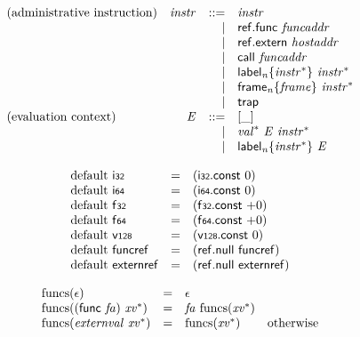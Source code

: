 $$
\begin{array}{@{}lrrl@{}l@{}}
\mbox{(administrative instruction)} & {\mathit{instr}} &::=& {\mathit{instr}} \\ &&|&
\mathsf{ref.func}~{\mathit{funcaddr}} \\ &&|&
\mathsf{ref.extern}~{\mathit{hostaddr}} \\ &&|&
\mathsf{call}~{\mathit{funcaddr}} \\ &&|&
{{\mathsf{label}}_{{\mathit{n}}}}{\{{{\mathit{instr}}^\ast}\}}~{{\mathit{instr}}^\ast} \\ &&|&
{{\mathsf{frame}}_{{\mathit{n}}}}{\{{\mathit{frame}}\}}~{{\mathit{instr}}^\ast} \\ &&|&
\mathsf{trap} \\
\mbox{(evaluation context)} & {\mathit{E}} &::=& {}[\mathsf{\_}] \\ &&|&
{{\mathit{val}}^\ast}~{\mathit{E}}~{{\mathit{instr}}^\ast} \\ &&|&
{{\mathsf{label}}_{{\mathit{n}}}}{\{{{\mathit{instr}}^\ast}\}}~{\mathit{E}} \\
\end{array}
$$

\vspace{1ex}

$$
\begin{array}{@{}lcl@{}l@{}}
{\mathrm{default}}~\mathsf{i{\scriptstyle32}} &=& (\mathsf{i{\scriptstyle32}}.\mathsf{const}~0) &  \\
{\mathrm{default}}~\mathsf{i{\scriptstyle64}} &=& (\mathsf{i{\scriptstyle64}}.\mathsf{const}~0) &  \\
{\mathrm{default}}~\mathsf{f{\scriptstyle32}} &=& (\mathsf{f{\scriptstyle32}}.\mathsf{const}~{+0}) &  \\
{\mathrm{default}}~\mathsf{f{\scriptstyle64}} &=& (\mathsf{f{\scriptstyle64}}.\mathsf{const}~{+0}) &  \\
{\mathrm{default}}~\mathsf{v{\scriptstyle128}} &=& (\mathsf{v{\scriptstyle128}}.\mathsf{const}~0) &  \\
{\mathrm{default}}~\mathsf{funcref} &=& (\mathsf{ref.null}~\mathsf{funcref}) &  \\
{\mathrm{default}}~\mathsf{externref} &=& (\mathsf{ref.null}~\mathsf{externref}) &  \\
\end{array}
$$

\vspace{1ex}

$$
\begin{array}{@{}lcl@{}l@{}}
{\mathrm{funcs}}(\epsilon) &=& \epsilon &  \\
{\mathrm{funcs}}((\mathsf{func}~{\mathit{fa}})~{{\mathit{xv}}^\ast}) &=& {\mathit{fa}}~{\mathrm{funcs}}({{\mathit{xv}}^\ast}) &  \\
{\mathrm{funcs}}({\mathit{externval}}~{{\mathit{xv}}^\ast}) &=& {\mathrm{funcs}}({{\mathit{xv}}^\ast}) &\quad
  \mbox{otherwise} \\
\end{array}
$$

